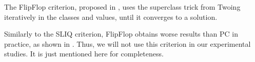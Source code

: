 The FlipFlop criterion, proposed in \cite{nadas1991iterative}, uses the superclass trick from Twoing iteratively in the classes and values, until it converges to a solution.
% 
% 
% 
% 
% 
% 


Similarly to the SLIQ criterion, FlipFlop obtains worse results than PC in practice, as shown in \cite{journals/datamine/CoppersmithHH99}. Thus, we will not use this criterion in our experimental studies. It is just mentioned here for completeness.


